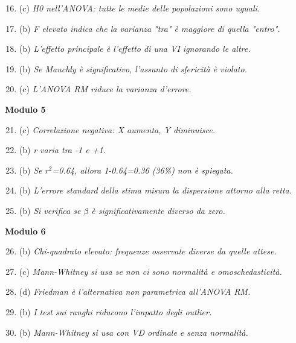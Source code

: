 \documentclass[12pt, a4paper]{article}
\begin{document}
\begin{footnotesize}
\begin{multicols}{2}
\begin{enumerate}
    \setcounter{enumi}{15}
    \item (c) \textit{H0 nell'ANOVA: tutte le medie delle popolazioni sono uguali.}
    \item (b) \textit{F elevato indica che la varianza "tra" è maggiore di quella "entro".}
    \item (b) \textit{L'effetto principale è l'effetto di una VI ignorando le altre.}
    \item (b) \textit{Se Mauchly è significativo, l'assunto di sfericità è violato.}
    \item (c) \textit{L'ANOVA RM riduce la varianza d'errore.}
\end{enumerate}
\vspace{0.5cm}
\textbf{Modulo 5}
\begin{enumerate}
    \setcounter{enumi}{20}
    \item (c) \textit{Correlazione negativa: X aumenta, Y diminuisce.}
    \item (b) \textit{r varia tra -1 e +1.}
    \item (b) \textit{Se $r^2$=0.64, allora 1-0.64=0.36 (36\%) non è spiegata.}
    \item (b) \textit{L'errore standard della stima misura la dispersione attorno alla retta.}
    \item (b) \textit{Si verifica se $\beta$ è significativamente diverso da zero.}
\end{enumerate}
\vspace{0.5cm}
\textbf{Modulo 6}
\begin{enumerate}
    \setcounter{enumi}{25}
    \item (b) \textit{Chi-quadrato elevato: frequenze osservate diverse da quelle attese.}
    \item (c) \textit{Mann-Whitney si usa se non ci sono normalità e omoschedasticità.}
    \item (d) \textit{Friedman è l'alternativa non parametrica all'ANOVA RM.}
    \item (b) \textit{I test sui ranghi riducono l'impatto degli outlier.}
    \item (b) \textit{Mann-Whitney si usa con VD ordinale e senza normalità.}
\end{enumerate}
\end{multicols}
\end{footnotesize}
\end{document}
